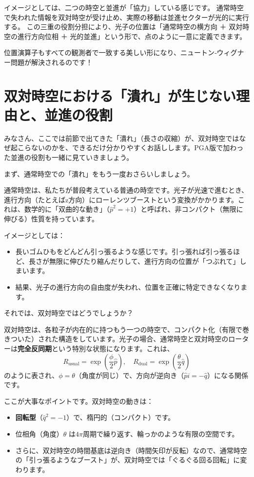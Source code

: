 \documentclass[dvipdfmx,a4paper,oneside]{jsbook}
\begin{document}
イメージとしては、二つの時空と並進が「協力」している感じです。  
通常時空で失われた情報を双対時空が受け止め、実際の移動は並進セクターが光的に実行する。  
この三重の役割分担により、光子の位置は「通常時空の横方向 ＋ 双対時空の進行方向位相 ＋ 光的並進」という形で、点のように一意に定義できます。

位置演算子もすべての観測者で一致する美しい形になり、ニュートン‐ウィグナー問題が解決されるのです！

\section{双対時空における「潰れ」が生じない理由と、並進の役割}

みなさん、ここでは前節で出てきた「潰れ」（長さの収縮）が、双対時空ではなぜ起こらないのかを、できるだけ分かりやすくお話しします。PGA版で加わった並進の役割も一緒に見ていきましょう。

まず、通常時空での「潰れ」をもう一度おさらいしましょう。

通常時空は、私たちが普段考えている普通の時空です。光子が光速で進むとき、進行方向（たとえばz方向）にローレンツブーストという変換がかかります。これは、数学的に「双曲的な動き」（\(\hat{p}^2 = +1\)）と呼ばれ、非コンパクト（無限に伸びる）性質を持っています。

イメージとしては：
\begin{itemize}
  \item 長いゴムひもをどんどん引っ張るような感じです。引っ張れば引っ張るほど、長さが無限に伸びたり縮んだりして、進行方向の位置が「つぶれて」しまいます。
  \item 結果、光子の進行方向の自由度が失われ、位置を正確に特定できなくなります。
\end{itemize}

それでは、双対時空ではどうでしょうか？

双対時空は、各粒子が内在的に持つもう一つの時空で、コンパクト化（有限で巻きついた）された構造をしています。光子の場合、通常時空と双対時空のローターは\textbf{完全反同期}という特別な状態になります。これは、
\[
R_{\text{usual}} = \exp\left( \frac{\phi}{2} \hat{p} \right), \quad
R_{\text{dual}} = \exp\left( \frac{\theta}{2} \hat{q} \right)
\]
のように表され、\(\phi = \theta\)（角度が同じ）で、方向が逆向き（\(\hat{p} i = -\hat{q}\)）になる関係です。

ここが大事なポイントです。双対時空の動きは：
\begin{itemize}
  \item \textbf{回転型}（\(\hat{q}^2 = -1\)）で、楕円的（コンパクト）です。
  \item 位相角（角度）\(\theta\) は\(4\pi\)周期で繰り返す、輪っかのような有限の空間です。
  \item さらに、双対時空の時間基底は逆向き（時間矢印が反転）なので、通常時空の「引っ張るようなブースト」が、双対時空では「ぐるぐる回る回転」に変わります。
\end{itemize}
\end{document}
